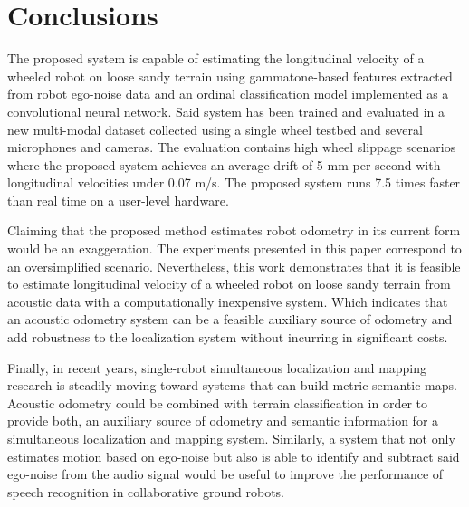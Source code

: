\section{Conclusions} \label{chap:conclusions}


The proposed system is capable of estimating the longitudinal velocity of a
wheeled robot on loose sandy terrain using gammatone-based features extracted
from robot ego-noise data and an ordinal classification model implemented as a
convolutional neural network. Said system has been trained and evaluated in a
new multi-modal dataset collected using a single wheel testbed and several
microphones and cameras. The evaluation contains high wheel slippage scenarios
where the proposed system achieves an average drift of 5 mm per second with
longitudinal velocities under 0.07 m/s. The proposed system runs 7.5 times
faster than real time on a user-level hardware.


Claiming that the proposed method estimates robot odometry in its current form
would be an exaggeration. The experiments presented in this paper correspond to
an oversimplified scenario. Nevertheless, this work demonstrates that it is
feasible to estimate longitudinal velocity of a wheeled robot on loose sandy
terrain from acoustic data with a computationally inexpensive system. Which
indicates that an acoustic odometry system can be a feasible auxiliary source
of odometry and add robustness to the localization system without incurring in
significant costs. 



Finally, in recent years, single-robot simultaneous localization and mapping
research is steadily moving toward systems that can build metric-semantic maps.
Acoustic odometry could be combined with terrain classification in order to
provide both, an auxiliary source of odometry and semantic information for a
simultaneous localization and mapping system. Similarly, a system that not only
estimates motion based on ego-noise but also is able to identify and subtract
said ego-noise from the audio signal would be useful to improve the performance
of speech recognition in collaborative ground robots. 

\balance